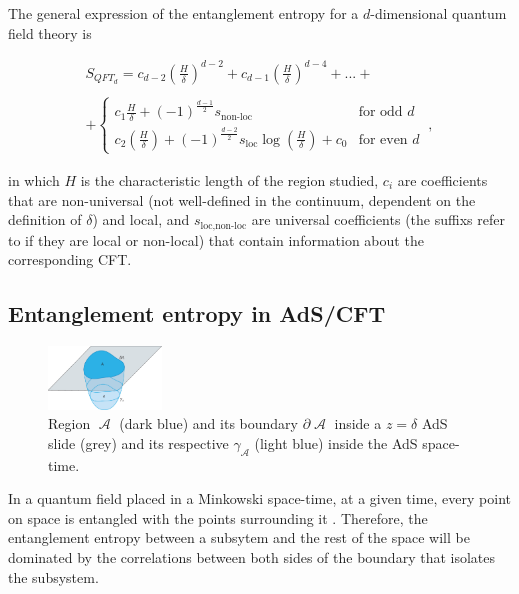 \documentclass[lettersize,journal]{IEEEtran}
\providecommand{\eq}[2]{
    \begin{equation}
        #2
    \label{eq:#1}
    \end{equation}
}
\DeclareMathOperator{\calA}{\mathcal{A}}
\begin{document}
The general expression of the entanglement entropy for a $d$-dimensional quantum field theory is
\eq{EE}{
    \begin{array}{cc}
        {S_{QFT_d} = c_{d-2} \left( \frac{H}{\delta} \right) ^{d-2} + c_{d-1} \left( \frac{H}{\delta} \right) ^{d-4} + ... + } \\ \\
        {+ \left \{ \begin{array}{cl} 
        c_1 \frac{H}{\delta} + (-1)^{\frac{d-1}{2}} s_{\text{non-loc}}
        & \text{for odd } d \\
        c_2 \left ( \frac{H}{\delta} \right ) + (-1)^{\frac{d-2}{2}} s_{\text{loc}} \log \left ( \frac{H}{\delta} \right ) + c_0
        & \text{for even } d
        \end{array} \right . \ ,}
    \end{array}
}
\cite{nishioka_entanglement_2018} in which $H$ is the characteristic length of the region studied, $c_i$ are coefficients that are non-universal (not well-defined in the continuum, dependent on the definition of $\delta$) and local, and $s_{\text{loc},\text{non-loc}}$ are universal coefficients (the suffixs refer to if they are local or non-local) that contain information about the corresponding CFT.


\subsection{Entanglement entropy in AdS/CFT} \label{ss:EE_AdS/CFT}

\begin{figure}
    \centering
    \includegraphics[width=0.27\textwidth]{../Imatges/Extern/EE_AdS-CFT.png}
\caption{Region $\calA$ (dark blue) and its boundary $\partial \calA$ inside a $z=\delta$ AdS slide (grey) and its respective $\gamma_{\calA}$ (light blue) inside the AdS space-time.}
\label{fig:EE_AdS-CFT}
\end{figure}

In a quantum field placed in a Minkowski space-time, at a given time, every point on space is entangled with the points surrounding it \cite{nishioka_entanglement_2018}. Therefore, the entanglement entropy between a subsytem and the rest of the space will be dominated by the correlations between both sides of the boundary that isolates the subsystem.
\end{document}
